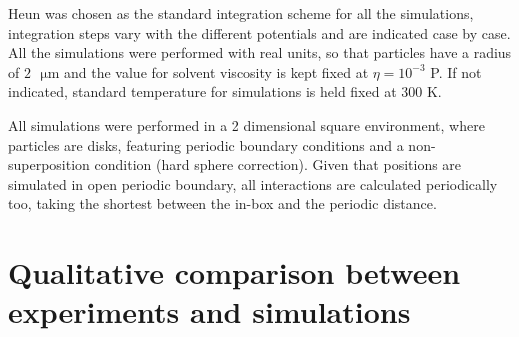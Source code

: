 \documentclass[../../master_thesis_np.tex]{subfiles}
\begin{document}
	Heun was chosen as the standard integration scheme for all the simulations, integration steps vary with the different potentials and are indicated case by case. All the simulations were performed with real units, so that particles have a radius of $2\text{ }\mathrm{\mu m}$ and the value for solvent viscosity is kept fixed at $\eta = 10^{-3}$ P. If not indicated, standard temperature for simulations is held fixed at $300$ K.
	
	All simulations were performed in a 2 dimensional square environment, where particles are disks, featuring periodic boundary conditions and a non-superposition condition (hard sphere correction). Given that positions are simulated in open periodic boundary, all interactions are calculated periodically too, taking the shortest between the in-box and the periodic distance.
	
	\section{Qualitative comparison between experiments and simulations}
	
\end{document}
